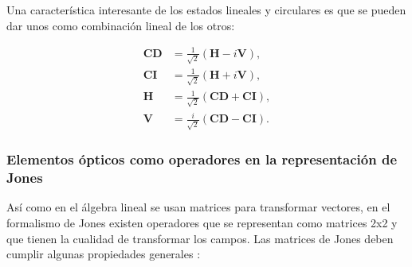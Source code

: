 Una característica interesante de los estados lineales y circulares es
que se pueden dar unos como combinación lineal de los otros:

\begin{align*}
\mathbf{CD} &= \frac{1}{\sqrt{2}}\left( \mathbf{H} -
  i\mathbf{V}\right),\\
\mathbf{CI} &= \frac{1}{\sqrt{2}}\left( \mathbf{H} +
  i\mathbf{V}\right),\\
\mathbf{H} &= \frac{1}{\sqrt{2}}\left( \mathbf{CD} +
  \mathbf{CI}\right),\\
\mathbf{V} &= \frac{i}{\sqrt{2}}\left( \mathbf{CD} -
  \mathbf{CI}\right).
\end{align*}

\subsubsection{Elementos ópticos como operadores en la representación
  de Jones}

Así como en el álgebra lineal se usan matrices para transformar
vectores, en el formalismo de Jones existen operadores que se
representan como matrices 2x2 y que tienen la cualidad de
transformar los campos.  Las matrices de Jones deben cumplir algunas
propiedades generales :

